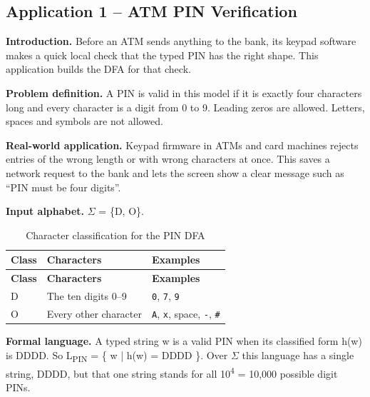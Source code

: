 \documentclass[12pt,a4paper]{article}
\begin{document}
\subsection{Application 1 -- ATM PIN Verification}

\textbf{Introduction.} Before an ATM sends anything to the bank, its keypad software makes a quick local check that the typed PIN has the right shape. This application builds the DFA for that check.

\textbf{Problem definition.} A PIN is valid in this model if it is exactly four characters long and every character is a digit from 0 to 9. Leading zeros are allowed. Letters, spaces and symbols are not allowed.

\textbf{Real-world application.} Keypad firmware in ATMs and card machines rejects entries of the wrong length or with wrong characters at once. This saves a network request to the bank and lets the screen show a clear message such as ``PIN must be four digits''.

\textbf{Input alphabet.} \ensuremath{\Sigma} = \{D, O\}.

{\small
\begin{longtable}{|>{\centering\arraybackslash}p{}|>{\raggedright\arraybackslash}p{}|>{\raggedright\arraybackslash}p{}|}
\caption[Character classification for the PIN DFA]{Character classification for the PIN DFA}\label{tab:pin_classes}\\
\hline
\rowcolor{hdr}\textbf{Class} & \textbf{Characters} & \textbf{Examples}\\ \hline
\endfirsthead
\hline
\rowcolor{hdr}\textbf{Class} & \textbf{Characters} & \textbf{Examples}\\ \hline
\endhead
D & The ten digits 0--9 & \texttt{0}, \texttt{7}, \texttt{9}\\ \hline
O & Every other character & \texttt{A}, \texttt{x}, space, \texttt{{-}}, \texttt{\#}\\ \hline
\end{longtable}}

\textbf{Formal language.} A typed string w is a valid PIN when its classified form h(w) is DDDD. So L\textsubscript{PIN} = \{ w | h(w) = DDDD \}. Over \ensuremath{\Sigma} this language has a single string, DDDD, but that one string stands for all 10\textsuperscript{4} = 10,000 possible digit PINs.
\end{document}
